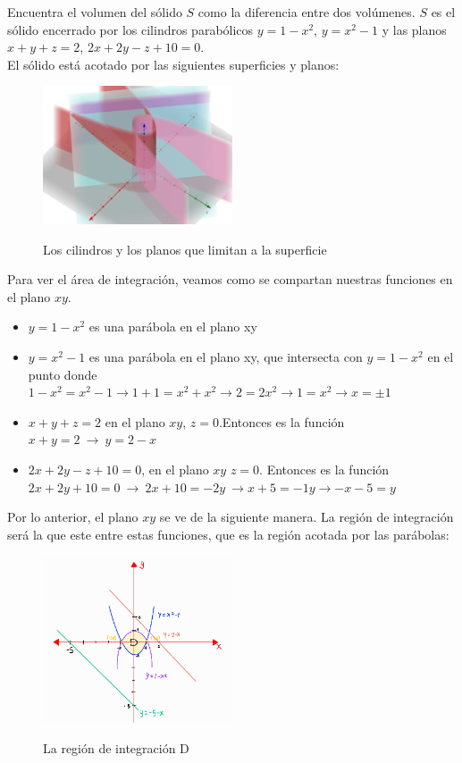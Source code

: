 \documentclass[12pt]{exam}
\begin{document}
\begin{questions}
     \question
     Encuentra el volumen del sólido $S$ como la diferencia entre dos volúmenes. $S$ es el sólido encerrado por los cilindros parabólicos $y=1-x^2$, $y=x^2-1$ y las planos $x+y+z=2$, $2x+2y-z+10=0$.\\
     El sólido está acotado por las siguientes superficies y planos:

      \begin{figure}[H]
      \centering
      \includegraphics[width=0.5\textwidth]{./img/i1e7.png}
      \label{fig:región}
      \caption{Los cilindros y los planos que limitan a la superficie}
      \end{figure}
      Para ver el área de integración, veamos como se compartan nuestras funciones en el plano $xy$.
      \begin{itemize}
      \item $y=1-x^2$ es una parábola en el plano xy
      \item $y=x^2-1$ es una parábola en el plano xy, que intersecta con $y=1-x^2$ en el punto donde $1-x^2 = x^2-1 \rightarrow  1+1 = x^2+x^2 \rightarrow  2 = 2x^2 \rightarrow 1 = x^2 \rightarrow x = \pm 1  $
      \item $x+y+z=2$ en el plano $xy$, $z=0$.Entonces es la función $x+y=2 ~ \rightarrow ~ y=2-x$
        \item $2x+2y-z+10=0$, en el plano $xy$ $z=0$. Entonces es la función $2x+2y+10=0 ~ \rightarrow ~ 2x+10=-2y ~  \rightarrow x+5=-1y \rightarrow -x-5 =y $
      \end{itemize}
      Por lo anterior, el plano $xy$ se ve de la siguiente manera. La región de integración será la que este entre estas funciones, que es la región acotada por las parábolas:
      
    \begin{figure}[H]
      \centering
      \includegraphics[width=0.5\textwidth]{./img/i2e7.png}
      \label{fig:región}
      \caption{La región de integración D}
    \end{figure}
    

\end{questions}
\end{document}
